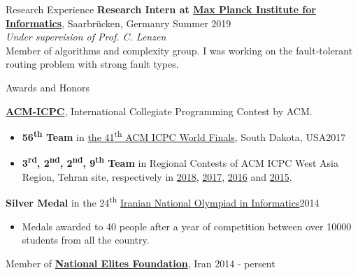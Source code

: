 \documentclass{resume} %
\begin{document}

\begin{rSection}{Research Experience}
{\bf Research Intern at \href{https://www.mpi-inf.mpg.de/}{Max Planck Institute for Informatics}}, \small{Saarbr{\"u}cken, Germanry \hfill Summer 2019}
\\\textit{Under supervision of Prof. C. Lenzen}
	\\Member of algorithms and complexity group. I was working on the fault-tolerant routing problem with strong fault types.
\end{rSection}


\begin{rSection}{Awards and Honors}
	
	{\bf \href{http://icpc.baylor.edu/}{ACM-ICPC}}, International Collegiate Programming Contest by ACM.
	\begin{itemize}
		\item {\bf 56\textsuperscript{th} Team} in
		\href{https://icpc.baylor.edu/community/results-2017}{the 41\textsuperscript{th} ACM ICPC World Finals},
		South Dakota, USA\hfill 2017
		
		\item {\bf 3\textsuperscript{rd}, 2\textsuperscript{nd}, 2\textsuperscript{nd}, 9\textsuperscript{th} Team} in Regional Contests of ACM ICPC West Asia Region,
		Tehran site, respectively in
		\href{http://icpc.sharif.edu/acmicpc18/scoreboard/}{2018},
		\href{http://icpc.sharif.edu/acmicpc17/scoreboard/}{2017},
		\href{http://icpc.sharif.edu/acmicpc16/scoreboard/}{2016} and
		\href{http://icpc.sharif.edu/acmicpc15/scoreboard/}{2015}.
	\end{itemize}
	
	{\bf Silver Medal} in the 24\textsuperscript{th} \href{http://inoi.ir/}{Iranian National Olympiad in Informatics}\hfill 2014
	\begin{itemize}
		\item[] Medals awarded to 40 people after a year of competition between over 10000 students from all the country.
	\end{itemize}
	
	Member of \href{https://www.bmn.ir/}{{\bf National Elites Foundation}}, Iran \hfill 2014 - persent
	
\end{rSection}
\end{document}
